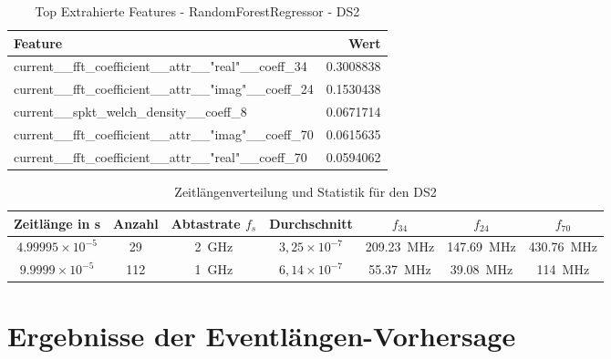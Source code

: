 \begin{table}[h!]
\centering
\caption{Top Extrahierte Features - RandomForestRegressor - DS2}
\label{tab:ds2-features}
\begin{tabular}{l r}
\hline
\textbf{Feature} & \textbf{Wert} \\
\hline
current\_\_fft\_coefficient\_\_attr\_\_"real"\_\_coeff\_34 & 0.3008838 \\
current\_\_fft\_coefficient\_\_attr\_\_"imag"\_\_coeff\_24 & 0.1530438 \\
current\_\_spkt\_welch\_density\_\_coeff\_8 & 0.0671714 \\
current\_\_fft\_coefficient\_\_attr\_\_"imag"\_\_coeff\_70 & 0.0615635 \\
current\_\_fft\_coefficient\_\_attr\_\_"real"\_\_coeff\_70 & 0.0594062 \\
\hline
\end{tabular}
\end{table}


\begin{table}[h!]
\centering
\begin{tabular}{|c|c|c|c|c|c|c|}
\hline
\textbf{Zeitlänge in s} & \textbf{Anzahl} & \textbf{Abtastrate} $f_s$ & \textbf{Durchschnitt} & \(f_{34}\) & \(f_{24}\) & \(f_{70}\)\\
\hline
$4.99995 \times 10^{-5}$ & 29  & \SI{2}{\giga\hertz} & $3,25 \times 10^{-7}$ & \SI{209,23}{\mega\hertz} & \SI{147,69}{\mega\hertz} & \SI{430,76}{\mega\hertz}\\
$9.9999 \times 10^{-5}$  & 112 & \SI{1}{\giga\hertz} & $6,14 \times 10^{-7}$ & \SI{55,37}{\mega\hertz} & \SI{39,08}{\mega\hertz} & \SI{114}{\mega\hertz}\\
\hline
\end{tabular}
\caption{Zeitlängenverteilung und Statistik für den DS2}
\label{tab:ds2-sample}
\end{table}




\section{Ergebnisse der Eventlängen-Vorhersage}

